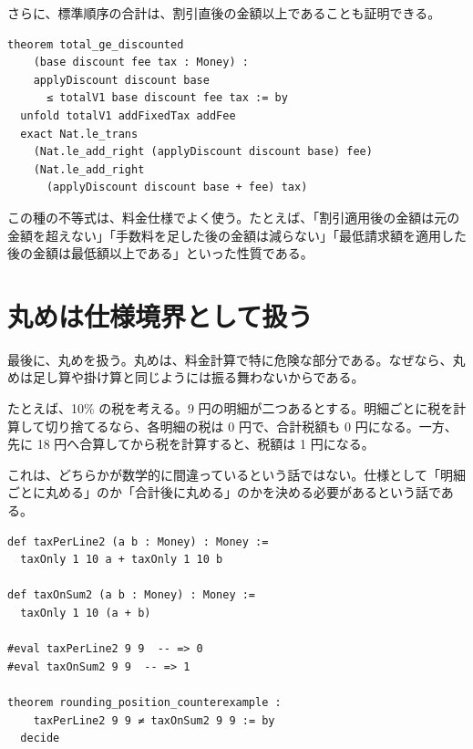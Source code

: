 さらに、標準順序の合計は、割引直後の金額以上であることも証明できる。

\begin{listing}[htbp]
\begin{verbatim}
theorem total_ge_discounted
    (base discount fee tax : Money) :
    applyDiscount discount base
      ≤ totalV1 base discount fee tax := by
  unfold totalV1 addFixedTax addFee
  exact Nat.le_trans
    (Nat.le_add_right (applyDiscount discount base) fee)
    (Nat.le_add_right
      (applyDiscount discount base + fee) tax)
\end{verbatim}
\caption{標準順序の合計は割引直後の金額以上である}
\label{lst:ch20-total-ge-discounted}
\end{listing}

この種の不等式は、料金仕様でよく使う。たとえば、「割引適用後の金額は元の金額を超えない」「手数料を足した後の金額は減らない」「最低請求額を適用した後の金額は最低額以上である」といった性質である。

\section{丸めは仕様境界として扱う}

最後に、丸めを扱う。丸めは、料金計算で特に危険な部分である。なぜなら、丸めは足し算や掛け算と同じようには振る舞わないからである。

たとえば、10\% の税を考える。9 円の明細が二つあるとする。明細ごとに税を計算して切り捨てるなら、各明細の税は 0 円で、合計税額も 0 円になる。一方、先に 18 円へ合算してから税を計算すると、税額は 1 円になる。

これは、どちらかが数学的に間違っているという話ではない。仕様として「明細ごとに丸める」のか「合計後に丸める」のかを決める必要があるという話である。

\begin{listing}[htbp]
\begin{verbatim}
def taxPerLine2 (a b : Money) : Money :=
  taxOnly 1 10 a + taxOnly 1 10 b

def taxOnSum2 (a b : Money) : Money :=
  taxOnly 1 10 (a + b)

#eval taxPerLine2 9 9  -- => 0
#eval taxOnSum2 9 9  -- => 1

theorem rounding_position_counterexample :
    taxPerLine2 9 9 ≠ taxOnSum2 9 9 := by
  decide
\end{verbatim}
\caption{丸め位置によって税額が変わる反例}
\label{lst:ch20-rounding-counterexample}
\end{listing}

